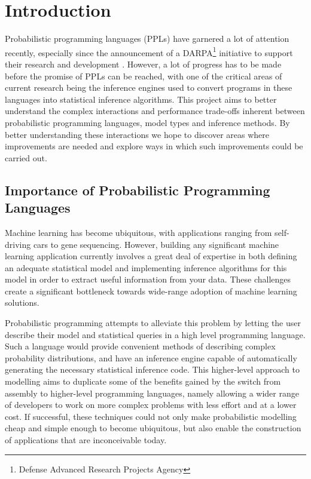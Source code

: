 \chapter{Introduction}

\setcounter{page}{1} 

Probabilistic programming languages (PPLs) have garnered a lot of attention recently, especially since the announcement of a DARPA\footnote{Defense Advanced Research Projects Agency} initiative to support their research and development \cite{ppaml}. However, a lot of progress has to be made before the promise of PPLs can be reached, with one of the critical areas of current research being the inference engines used to convert programs in these languages into statistical inference algorithms. This project aims to better understand the complex interactions and performance trade-offs inherent between probabilistic programming languages, model types and inference methods. By better understanding these interactions we hope to discover areas where improvements are needed and explore ways in which such improvements could be carried out.

\section{Importance of Probabilistic Programming Languages}
\label{sect:importance}
Machine learning has become ubiquitous, with applications ranging from self-driving cars to gene sequencing. However, building any significant machine learning application currently involves a great deal of expertise in both defining an adequate statistical model and implementing inference algorithms for this model in order to extract useful information from your data. These challenges create a significant bottleneck towards wide-range adoption of machine learning solutions.

Probabilistic programming attempts to alleviate this problem by letting the user describe their model and statistical queries in a high level programming language. Such a language would provide convenient methods of describing complex probability distributions, and have an inference engine capable of automatically generating the necessary statistical inference code. This higher-level approach to modelling aims to duplicate some of the benefits gained by the switch from assembly to higher-level programming languages, namely allowing a wider range of developers to work on more complex problems with less effort and at a lower cost. If successful, these techniques could not only make probabilistic modelling cheap and simple enough to become ubiquitous, but also enable the construction of applications that are inconceivable today.

